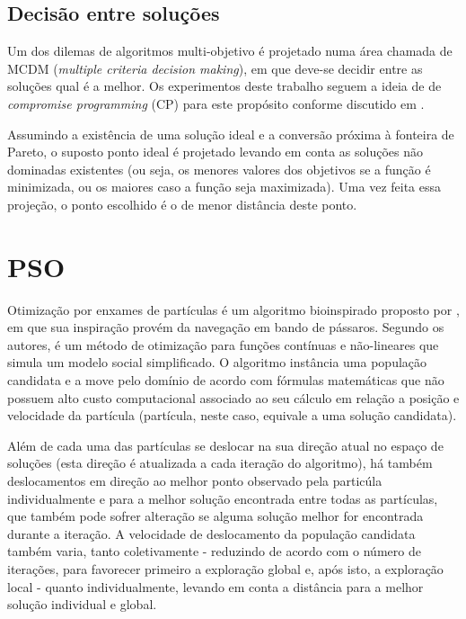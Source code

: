 \subsection{Decisão entre soluções}

Um dos dilemas de algoritmos multi-objetivo é projetado numa área chamada de MCDM (\textit{multiple criteria decision making}), em que deve-se decidir entre as soluções qual é a melhor. Os experimentos deste trabalho seguem a ideia de \cite{datamining} de \textit{compromise programming} (CP) para este propósito conforme discutido em \cite{cp}. 

Assumindo a existência de uma solução ideal e a conversão próxima à fonteira de Pareto, o suposto ponto ideal é projetado levando em conta as soluções não dominadas existentes (ou seja, os menores valores dos objetivos se a função é minimizada, ou os maiores caso a função seja maximizada). Uma vez feita essa projeção, o ponto escolhido é o de menor distância deste ponto.


\section{PSO}

Otimização por enxames de partículas é um algoritmo bioinspirado proposto por \cite{PSO}, em que sua inspiração provém da navegação em bando de pássaros. Segundo os autores, é um método de otimização para funções contínuas e não-lineares que simula um modelo social simplificado. O algoritmo instância uma população candidata e a move pelo domínio de acordo com fórmulas matemáticas que não possuem alto custo computacional associado ao seu cálculo em relação a posição e velocidade da partícula (partícula, neste caso, equivale a uma solução candidata).

Além de cada uma das partículas se deslocar na sua direção atual no espaço de soluções (esta direção é atualizada a cada iteração do algoritmo), há também deslocamentos em direção ao melhor ponto observado pela particúla individualmente e para a melhor solução encontrada entre todas as partículas, que também pode sofrer alteração se alguma solução melhor for encontrada durante a iteração. A velocidade de deslocamento da população candidata também varia, tanto coletivamente - reduzindo de acordo com o número de iterações, para favorecer primeiro a exploração global e, após isto, a exploração local - quanto individualmente, levando em conta a distância para a melhor solução individual e global.

